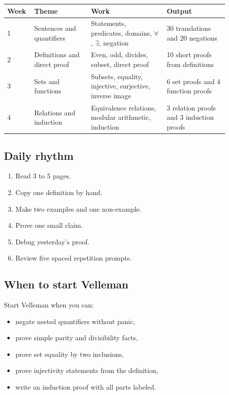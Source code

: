 \documentclass[11pt]{article}
\begin{document}
\begin{longtable}{p{0.08\linewidth}p{0.24\linewidth}p{0.32\linewidth}p{0.26\linewidth}}
\toprule
Week & Theme & Work & Output \\
\midrule
1 & Sentences and quantifiers & Statements, predicates, domains, $\forall$, $\exists$, negation & 30 translations and 20 negations \\
2 & Definitions and direct proof & Even, odd, divides, subset, direct proof & 10 short proofs from definitions \\
3 & Sets and functions & Subsets, equality, injective, surjective, inverse image & 6 set proofs and 4 function proofs \\
4 & Relations and induction & Equivalence relations, modular arithmetic, induction & 3 relation proofs and 3 induction proofs \\
\bottomrule
\end{longtable}

\subsection{Daily rhythm}

\begin{enumerate}
\item Read 3 to 5 pages.
\item Copy one definition by hand.
\item Make two examples and one non-example.
\item Prove one small claim.
\item Debug yesterday's proof.
\item Review five spaced repetition prompts.
\end{enumerate}

\subsection{When to start Velleman}

Start Velleman when you can:

\begin{itemize}
\item negate nested quantifiers without panic,
\item prove simple parity and divisibility facts,
\item prove set equality by two inclusions,
\item prove injectivity statements from the definition,
\item write an induction proof with all parts labeled.
\end{itemize}
\end{document}
